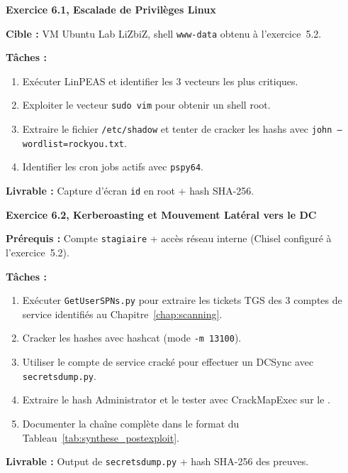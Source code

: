 \begin{boxexo}
\textbf{Exercice 6.1, Escalade de Privilèges Linux}

\medskip
\textbf{Cible :} VM Ubuntu Lab LiZbiZ, shell \texttt{www-data} obtenu
à l'exercice~5.2.

\medskip
\textbf{Tâches :}
\begin{enumerate}
    \item Exécuter LinPEAS et identifier les 3 vecteurs les plus critiques.
    \item Exploiter le vecteur \texttt{sudo vim} pour obtenir un shell root.
    \item Extraire le fichier \texttt{/etc/shadow} et tenter de cracker
          les hashs avec \texttt{john --wordlist=rockyou.txt}.
    \item Identifier les cron jobs actifs avec \texttt{pspy64}.
\end{enumerate}

\medskip
\textbf{Livrable :} Capture d'écran \texttt{id} en root + hash SHA-256.
\end{boxexo}

\begin{boxexo}
\textbf{Exercice 6.2, Kerberoasting et Mouvement Latéral vers le DC}

\medskip
\textbf{Prérequis :} Compte \texttt{stagiaire} + accès réseau interne
(Chisel configuré à l'exercice~5.2).

\medskip
\textbf{Tâches :}
\begin{enumerate}
    \item Exécuter \texttt{GetUserSPNs.py} pour extraire les tickets TGS
          des 3 comptes de service identifiés au Chapitre~\ref{chap:scanning}.
    \item Cracker les hashes avec hashcat (mode \texttt{-m 13100}).
    \item Utiliser le compte de service cracké pour effectuer un DCSync
          avec \texttt{secretsdump.py}.
    \item Extraire le hash Administrator et le tester avec CrackMapExec
          sur le .
    \item Documenter la chaîne complète dans le format du
          Tableau~\ref{tab:synthese_postexploit}.
\end{enumerate}

\medskip
\textbf{Livrable :} Output de \texttt{secretsdump.py} + hash SHA-256
des preuves.
\end{boxexo}

